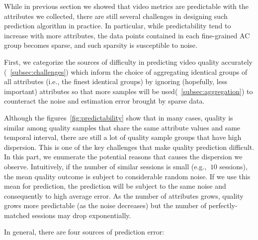 \label{sec:challenges}

While in previous section we showed that video metrics are predictable with the attributes we collected, there are still several challenges in designing such prediction algorithm in practice. In particular, while predictability tend to increase with more attributes, the data points contained in each fine-grained AC group becomes sparse, and such sparsity is susceptible to noise.


First, we categorize the sources of difficulty in predicting video quality accurately (\Section~\ref{subsec:challenges}) which inform the choice of aggregating identical groups of all attributes (i.e., the finest identical groups) by ignoring (hopefully, less important) attributes so that more samples will be used(\Section~\ref{subsec:aggregation}) to counteract the noise and estimation error brought by sparse data.


\label{subsec:challenges}
Although the figures~\ref{fig:predictability} show that in many cases, quality is similar among quality samples that share the same attribute values and same temporal interval, there are still a lot of quality sample groups that have high dispersion. This is one of the key challenges that make quality prediction difficult. 
In this part, we enumerate the potential reasons that causes the dispersion we observe. Intuitively, if the number of similar sessions is small (e.g., $~10$ sessions), the mean quality outcome is subject to considerable random noise.  If we use this mean for prediction, the prediction will be subject to the same noise and consequently to high average error.  As the number of attributes grows, quality grows more predictable (as the noise decreases) but the number of perfectly-matched sessions may drop exponentially.

In general, there are four sources of prediction error:

